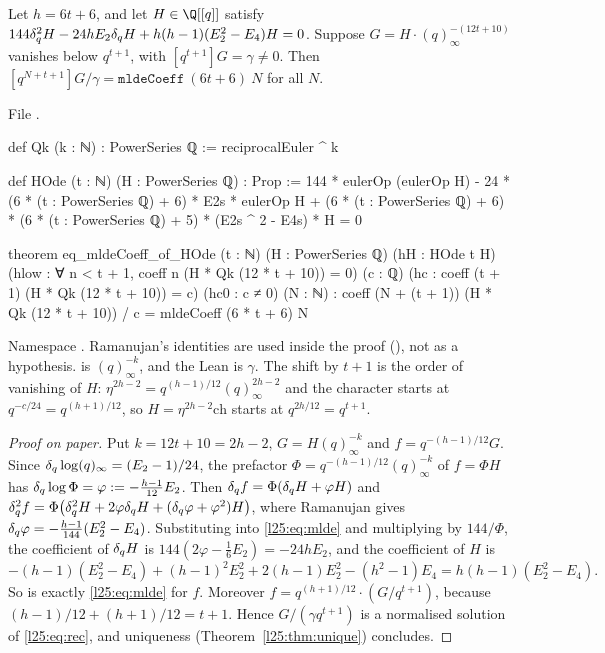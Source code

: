 \begin{theorem}\label{l25:thm:HOde}
Let $h=6t+6$, and let $H\in\Q[[q]]$ satisfy
$144\delta_q^2H-24hE_2\delta_q H+h(h-1)(E_2^2-E_4)H=0$. Suppose $G=H\cdot(q)_\infty^{-(12t+10)}$ vanishes
below $q^{t+1}$, with $[q^{t+1}]G=\gamma\ne0$. Then $[q^{N+t+1}]G/\gamma=\mathtt{mldeCoeff}\ (6t+6)\ N$ for all $N$.
\end{theorem}
\noindent File .
\begin{leancode}
def Qk (k : ℕ) : PowerSeries ℚ := reciprocalEuler ^ k

def HOde (t : ℕ) (H : PowerSeries ℚ) : Prop :=
  144 * eulerOp (eulerOp H) - 24 * (6 * (t : PowerSeries ℚ) + 6) * E2s * eulerOp H +
    (6 * (t : PowerSeries ℚ) + 6) * (6 * (t : PowerSeries ℚ) + 5) * (E2s ^ 2 - E4s) * H = 0

theorem eq_mldeCoeff_of_HOde (t : ℕ) (H : PowerSeries ℚ)
    (hH : HOde t H) (hlow : ∀ n < t + 1, coeff n (H * Qk (12 * t + 10)) = 0) (c : ℚ)
    (hc : coeff (t + 1) (H * Qk (12 * t + 10)) = c) (hc0 : c ≠ 0) (N : ℕ) :
    coeff (N + (t + 1)) (H * Qk (12 * t + 10)) / c = mldeCoeff (6 * t + 6) N
\end{leancode}
\begin{dictionary}
Namespace . Ramanujan's identities are used inside the proof
(), not as a hypothesis.  is $(q)_\infty^{-k}$, and the Lean  is
$\gamma$. The shift by $t+1$ is the order of vanishing of $H$: $\eta^{2h-2}=q^{(h-1)/12}(q)_\infty^{2h-2}$ and the
character starts at $q^{-c/24}=q^{(h+1)/12}$, so $H=\eta^{2h-2}\mathrm{ch}$ starts at $q^{2h/12}=q^{t+1}$.
\end{dictionary}
\begin{proof}[Proof on paper]
Put $k=12t+10=2h-2$, $G=H(q)_\infty^{-k}$ and $f=q^{-(h-1)/12}G$. Since $\delta_q\log(q)_\infty=(E_2-1)/24$,
the prefactor $\Phi=q^{-(h-1)/12}(q)_\infty^{-k}$ of $f=\Phi H$ has $\delta_q\log\Phi=\varphi:=-\frac{h-1}{12}E_2$.
Then $\delta_q f=\Phi(\delta_q H+\varphi H)$ and
$\delta_q^2f=\Phi\big(\delta_q^2H+2\varphi\delta_q H+(\delta_q\varphi+\varphi^2)H\big)$, where Ramanujan
gives $\delta_q\varphi=-\frac{h-1}{144}(E_2^2-E_4)$. Substituting into \eqref{l25:eq:mlde} and multiplying by
$144/\Phi$, the coefficient of $\delta_q H$ is $144(2\varphi-\frac16E_2)=-24hE_2$, and the coefficient of $H$ is
\begin{equation*}
-(h-1)(E_2^2-E_4)+(h-1)^2E_2^2+2(h-1)E_2^2-(h^2-1)E_4=h(h-1)(E_2^2-E_4).
\end{equation*}
So  is exactly \eqref{l25:eq:mlde} for $f$. Moreover $f=q^{(h+1)/12}\cdot(G/q^{t+1})$, because
$(h-1)/12+(h+1)/12=t+1$. Hence $G/(\gamma q^{t+1})$ is a normalised solution of \eqref{l25:eq:rec}, and uniqueness
(Theorem~\ref{l25:thm:unique}) concludes.
\end{proof}
